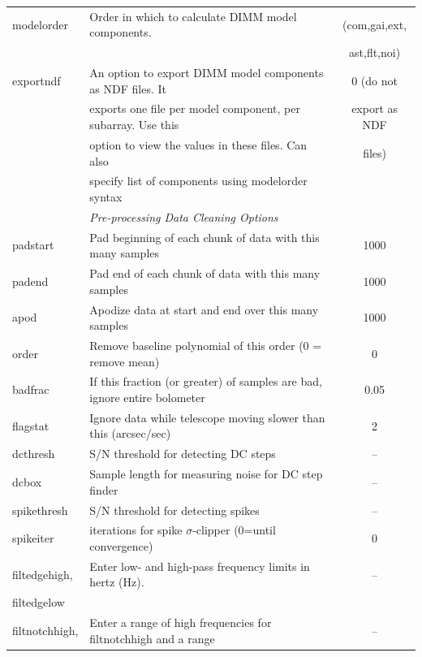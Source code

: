 \documentclass[twoside,11pt]{article}
\renewcommand{\_}{\texttt{\symbol{95}}}
\begin{document}
\begin{table}
\begin{tabular}{llc}
modelorder       & Order in which to calculate DIMM model components.                  & (com,gai,ext,\\
                 &                                                                     &  ast,flt,noi)\\
exportndf        & An option to export DIMM model components as NDF files. It          & 0 (do not\\
                 & exports one file per model component, per subarray. Use this        & export as NDF\\
                 & option to view the values in these files. Can also      & files)\\
                 & specify list of components using modelorder syntax                  & \\
\hline
                 & \multicolumn{2}{l}{\em Pre-processing Data Cleaning Options} \\
\hline
padstart         & Pad beginning of each chunk of data with this many samples          & 1000 \\
padend           & Pad end of each chunk of data with this many samples                & 1000 \\
apod             & Apodize data at start and end over this many samples                & 1000 \\
order            & Remove baseline polynomial of this order (0 = remove mean)          & 0 \\
badfrac          & If this fraction (or greater) of samples are bad, ignore entire bolometer            & 0.05 \\
flagstat         & Ignore data while telescope moving slower than this (arcsec/sec)    & 2 \\
dcthresh         & S/N threshold for detecting DC steps                                & -- \\
dcbox            & Sample length for measuring noise for DC step finder                & -- \\
spikethresh      & S/N threshold for detecting spikes                                  & -- \\
spikeiter        & iterations for spike $\sigma$-clipper (0=until convergence)         & 0 \\
filt\_edgehigh,  & Enter low- and high-pass frequency limits in hertz (Hz).            & -- \\
filt\_edgelow    & & \\
filt\_notchhigh, & Enter a range of high frequencies for filt\_notchhigh and a range   & -- \\

\end{tabular}
\end{table}
\end{document}
